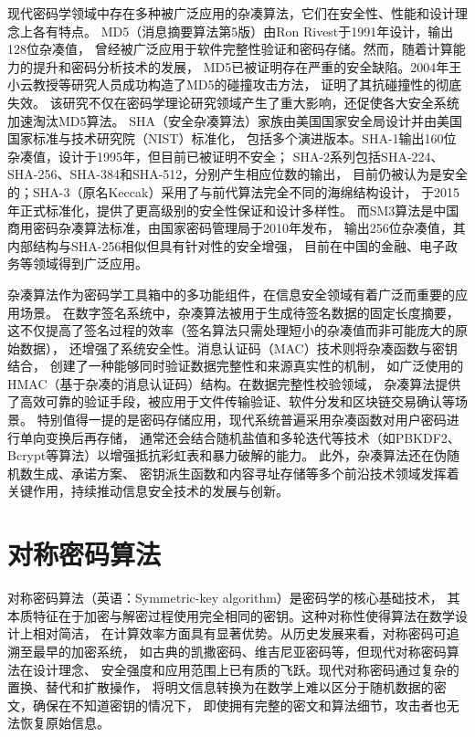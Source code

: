 现代密码学领域中存在多种被广泛应用的杂凑算法，它们在安全性、性能和设计理念上各有特点。
MD5（消息摘要算法第5版）由Ron Rivest于1991年设计，输出128位杂凑值，
曾经被广泛应用于软件完整性验证和密码存储。然而，随着计算能力的提升和密码分析技术的发展，
MD5已被证明存在严重的安全缺陷。2004年王小云教授等研究人员成功构造了MD5的碰撞攻击方法，
证明了其抗碰撞性的彻底失效。
该研究不仅在密码学理论研究领域产生了重大影响，还促使各大安全系统加速淘汰MD5算法。
SHA（安全杂凑算法）家族由美国国家安全局设计并由美国国家标准与技术研究院（NIST）标准化，
包括多个演进版本。SHA-1输出160位杂凑值，设计于1995年，但目前已被证明不安全；
SHA-2系列包括SHA-224、SHA-256、SHA-384和SHA-512，分别产生相应位数的输出，
目前仍被认为是安全的；SHA-3（原名Keccak）采用了与前代算法完全不同的海绵结构设计，
于2015年正式标准化，提供了更高级别的安全性保证和设计多样性。
而SM3算法是中国商用密码杂凑算法标准，由国家密码管理局于2010年发布，
输出256位杂凑值，其内部结构与SHA-256相似但具有针对性的安全增强，
目前在中国的金融、电子政务等领域得到广泛应用。

杂凑算法作为密码学工具箱中的多功能组件，在信息安全领域有着广泛而重要的应用场景。
在数字签名系统中，杂凑算法被用于生成待签名数据的固定长度摘要，
这不仅提高了签名过程的效率（签名算法只需处理短小的杂凑值而非可能庞大的原始数据），
还增强了系统安全性。消息认证码（MAC）技术则将杂凑函数与密钥结合，
创建了一种能够同时验证数据完整性和来源真实性的机制，
如广泛使用的HMAC（基于杂凑的消息认证码）结构。在数据完整性校验领域，
杂凑算法提供了高效可靠的验证手段，被应用于文件传输验证、软件分发和区块链交易确认等场景。
特别值得一提的是密码存储应用，现代系统普遍采用杂凑函数对用户密码进行单向变换后再存储，
通常还会结合随机盐值和多轮迭代等技术（如PBKDF2、Bcrypt等算法）以增强抵抗彩虹表和暴力破解的能力。
此外，杂凑算法还在伪随机数生成、承诺方案、
密钥派生函数和内容寻址存储等多个前沿技术领域发挥着关键作用，持续推动信息安全技术的发展与创新。

\section{对称密码算法}
对称密码算法（英语：Symmetric-key algorithm）是密码学的核心基础技术，
其本质特征在于加密与解密过程使用完全相同的密钥。这种对称性使得算法在数学设计上相对简洁，
在计算效率方面具有显著优势。从历史发展来看，对称密码可追溯至最早的加密系统，
如古典的凯撒密码、维吉尼亚密码等，但现代对称密码算法在设计理念、
安全强度和应用范围上已有质的飞跃。现代对称密码通过复杂的置换、替代和扩散操作，
将明文信息转换为在数学上难以区分于随机数据的密文，确保在不知道密钥的情况下，
即使拥有完整的密文和算法细节，攻击者也无法恢复原始信息。

